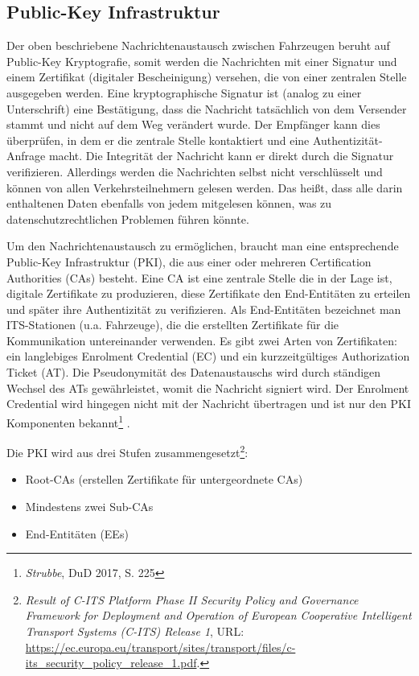 \subsection{Public-Key Infrastruktur}
\label{sec:FirstContentSection:FirstSubSection}

Der oben beschriebene Nachrichtenaustausch zwischen Fahrzeugen beruht auf Public-Key Kryptografie, somit werden die Nachrichten mit einer Signatur und einem Zertifikat (digitaler Bescheinigung) versehen, die von einer zentralen Stelle ausgegeben werden. Eine kryptographische Signatur ist (analog zu einer Unterschrift) eine Bestätigung, dass die Nachricht tatsächlich von dem Versender stammt und nicht auf dem Weg verändert wurde. Der Empfänger kann dies überprüfen, in dem er die zentrale Stelle kontaktiert und eine Authentizität-Anfrage macht. Die Integrität der Nachricht kann er direkt durch die Signatur verifizieren. Allerdings werden die Nachrichten selbst nicht verschlüsselt und können von allen Verkehrsteilnehmern gelesen werden. Das heißt, dass alle darin enthaltenen Daten ebenfalls von jedem mitgelesen können, was zu datenschutzrechtlichen Problemen führen könnte. 
 
Um den Nachrichtenaustausch zu ermöglichen, braucht man eine entsprechende Public-Key Infrastruktur (PKI), die aus einer oder mehreren Certification Authorities (CAs) besteht. Eine CA ist eine zentrale Stelle die in der Lage ist, digitale Zertifikate zu produzieren, diese Zertifikate den End-Entitäten zu erteilen und später ihre Authentizität zu verifizieren. Als End-Entitäten bezeichnet man ITS-Stationen (u.a. Fahrzeuge), die die erstellten Zertifikate für die Kommunikation untereinander verwenden. Es gibt zwei Arten von Zertifikaten: ein langlebiges Enrolment Credential (EC) und ein kurzzeitgültiges Authorization Ticket (AT). Die Pseudonymität des Datenaustauschs wird durch ständigen Wechsel des ATs gewährleistet, womit die Nachricht signiert wird. Der Enrolment Credential wird hingegen nicht mit der Nachricht übertragen und ist nur den PKI Komponenten bekannt\footnote{\emph{Strubbe}, DuD 2017, S. 225} \nocite{Strubbe2017}. 

Die PKI wird aus drei Stufen zusammengesetzt\footnote{\emph{Result of C-ITS Platform Phase II Security Policy and Governance Framework for Deployment and Operation of European Cooperative Intelligent Transport Systems (C-ITS) Release 1}, URL: \url{https://ec.europa.eu/transport/sites/transport/files/c-its\_security\_policy\_release\_1.pdf}.}\nocite{SecurityCITS}: 
\begin{itemize}
	\item Root-CAs (erstellen Zertifikate für untergeordnete CAs)
	\item Mindestens zwei Sub-CAs
	\item End-Entitäten (EEs)
\end{itemize}

